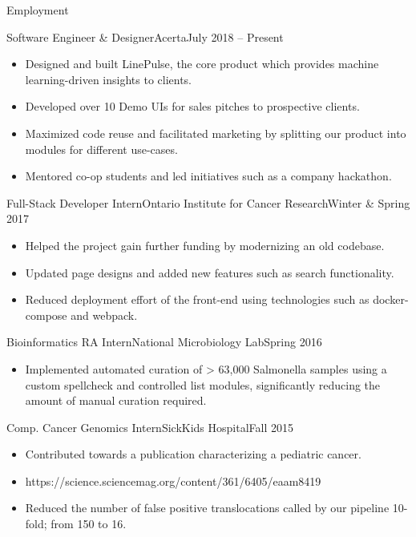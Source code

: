 \documentclass[]{mcdowellcv}
\begin{document}
	\begin{cvsection}{Employment}
		\begin{cvsubsection}{Software Engineer \& Designer}{Acerta}{July 2018 -- Present}
			\begin{itemize}
				\item Designed and built LinePulse, the core product which provides machine learning-driven insights to clients.
				\item Developed over 10 Demo UIs for sales pitches to prospective clients.
				\item Maximized code reuse and facilitated marketing by splitting our product into modules for different use-cases.
				\item Mentored co-op students and led initiatives such as a company hackathon.
			\end{itemize}
		\end{cvsubsection}
		
		\begin{cvsubsection}{Full-Stack Developer Intern}{Ontario Institute for Cancer Research}{Winter \& Spring 2017}	
			\begin{itemize}
				\item Helped the project gain further funding by modernizing an old codebase.
				\item Updated page designs and added new features such as search functionality.
				\item Reduced deployment effort of the front-end using technologies such as docker-compose and webpack.
			\end{itemize}
		\end{cvsubsection}
		
		\begin{cvsubsection}{Bioinformatics RA Intern}{National Microbiology Lab}{Spring 2016}		
			\begin{itemize}
				\item Implemented automated curation of > 63,000 Salmonella samples using a custom spellcheck and controlled list modules, significantly reducing the amount of manual curation required.
			\end{itemize}
		\end{cvsubsection}
		
		\begin{cvsubsection}{Comp. Cancer Genomics Intern}{SickKids Hospital}{Fall 2015}
			\begin{itemize}
				\item Contributed towards a publication characterizing a pediatric cancer.
				\item https://science.sciencemag.org/content/361/6405/eaam8419	
				\item Reduced the number of false positive translocations called by our pipeline 10-fold; from 150 to 16.
			\end{itemize}
		\end{cvsubsection}
	\end{cvsection}
	
\end{document}
